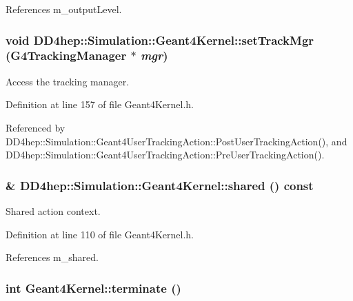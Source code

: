 References m\_\-outputLevel.\hypertarget{class_d_d4hep_1_1_simulation_1_1_geant4_kernel_aa5d1173163b58ade76d90a6a449b2357}{
\subsubsection[{setTrackMgr}]{\setlength{\rightskip}{0pt plus 5cm}void DD4hep::Simulation::Geant4Kernel::setTrackMgr (G4TrackingManager $\ast$ {\em mgr})}}
\label{class_d_d4hep_1_1_simulation_1_1_geant4_kernel_aa5d1173163b58ade76d90a6a449b2357}


Access the tracking manager. 

Definition at line 157 of file Geant4Kernel.h.

Referenced by DD4hep::Simulation::Geant4UserTrackingAction::PostUserTrackingAction(), and DD4hep::Simulation::Geant4UserTrackingAction::PreUserTrackingAction().\hypertarget{class_d_d4hep_1_1_simulation_1_1_geant4_kernel_aaa64984b672200e290612ccfef93f162}{
\subsubsection[{shared}]{\& DD4hep::Simulation::Geant4Kernel::shared () const}}
\label{class_d_d4hep_1_1_simulation_1_1_geant4_kernel_aaa64984b672200e290612ccfef93f162}


Shared action context. 

Definition at line 110 of file Geant4Kernel.h.

References m\_\-shared.\hypertarget{class_d_d4hep_1_1_simulation_1_1_geant4_kernel_ae73e828fed81e3343fe49f08701d3ac3}{
\subsubsection[{terminate}]{\setlength{\rightskip}{0pt plus 5cm}int Geant4Kernel::terminate ()}}
\label{class_d_d4hep_1_1_simulation_1_1_geant4_kernel_ae73e828fed81e3343fe49f08701d3ac3}


